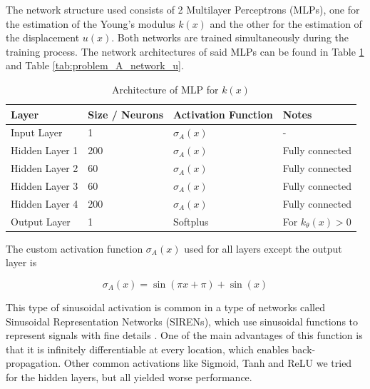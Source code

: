 The network structure used consists of 2 Multilayer Perceptrons (MLPs), one for the estimation of the Young's modulus $k(x)$ and the other for the estimation of the displacement $u(x)$. Both networks are trained simultaneously during the training process. The network architectures of said MLPs can be found in Table \ref{tab:problem_A_network_k} and Table \ref{tab:problem_A_network_u}.


\begin{table}[H]
\centering
\caption{Architecture of MLP for $k(x)$}
\label{tab:problem_A_network_k}
\begin{tabular}{llll}
\hline
\textbf{Layer} & \textbf{Size / Neurons} & \textbf{Activation Function} & \textbf{Notes} \\
\hline
Input Layer        & 1                                & $\sigma_A(x)$         & - \\
Hidden Layer 1     & 200                              & $\sigma_A(x)$       & Fully connected \\
Hidden Layer 2     & 60                               & $\sigma_A(x)$       & Fully connected \\
Hidden Layer 3     & 60                               & $\sigma_A(x)$       & Fully connected \\
Hidden Layer 4       & 200                            & $\sigma_A(x)$    & Fully connected \\
Output Layer       & 1                              & Softplus       & For $k_\theta(x) > 0$ \\
\hline
\end{tabular}
\end{table}

The custom activation function $\sigma_A(x)$ used for all layers except the output layer is

\begin{equation} \label{eq:custom_activation}
	\sigma_A(x) = \sin(\pi x + \pi) + \sin(x)
\end{equation}

This type of sinusoidal activation is common in a type of networks called Sinusoidal Representation Networks (SIRENs), which use sinusoidal functions to represent signals with fine details \cite{sitzmann2020implicitneuralrepresentationsperiodic}. One of the main advantages of this function is that it is infinitely differentiable at every location, which enables back-propagation. Other common activations like Sigmoid, Tanh and ReLU we tried for the hidden layers, but all yielded worse performance.

